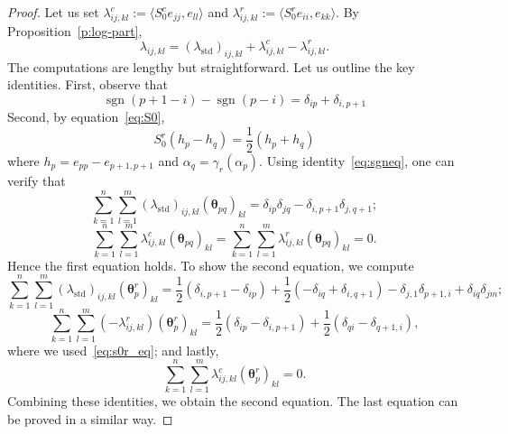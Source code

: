 \documentclass[11pt]{article}
\newcommand{\btheta}{{\boldsymbol{\theta}}}
\newcommand{\std}{\mathrm{std}}
\DeclareMathOperator{\sgn}{sgn}
\theoremstyle{definition}\newtheorem{definition}[theorem]{Definition}
\theoremstyle{definition}\newtheorem{remark}[theorem]{Remark}
\theoremstyle{remark}
\numberwithin{equation}{section}
\begin{document}
\begin{proof}
    Let us set $\lambda_{ij,kl}^c := \langle S_0^c e_{jj}, e_{ll}\rangle$ and $\lambda_{ij,kl}^r := \langle S_0^r e_{ii},e_{kk}\rangle$. By Proposition~\ref{p:log-part},
    \begin{equation*}
        \lambda_{ij,kl} = (\lambda_{\std})_{ij,kl} + \lambda_{ij,kl}^c-\lambda_{ij,kl}^r.
    \end{equation*}
    The computations are lengthy but straightforward. Let us outline the key identities. First, observe that 
    \begin{equation}\label{eq:sgneq}
        \sgn(p+1-i) -\sgn(p-i) = \delta_{ip}+\delta_{i,p+1}
    \end{equation}
    Second, by equation~\eqref{eq:S0},
    \begin{equation}\label{eq:s0r_eq}
        S_0^r(h_p-h_q) = \frac{1}{2}(h_p+h_q)
    \end{equation}
    where $h_p = e_{pp}-e_{p+1,p+1}$ and $\alpha_q = \gamma_r(\alpha_p)$. Using identity~\eqref{eq:sgneq}, one can verify that
    \begin{equation*}
        \sum_{k=1}^n\sum_{l=1}^m (\lambda_{\std})_{ij,kl} (\btheta_{pq})_{kl} = \delta_{ip}\delta_{jq} - \delta_{i,p+1}\delta_{j,q+1};
    \end{equation*}
    \begin{equation*}
        \sum_{k=1}^n\sum_{l=1}^m \lambda_{ij,kl}^c (\btheta_{pq})_{kl} = \sum_{k=1}^n\sum_{l=1}^m \lambda_{ij,kl}^r (\btheta_{pq})_{kl} = 0.
    \end{equation*}
    Hence the first equation holds. To show the second equation, we compute
    \begin{equation*}
        \sum_{k=1}^n \sum_{l=1}^m (\lambda_{\std})_{ij,kl}(\btheta_p^r)_{kl} = \frac{1}{2}( \delta_{i,p+1}-\delta_{ip}) + \frac{1}{2}(-\delta_{iq} + \delta_{i,q+1}) - \delta_{j,1}\delta_{p+1,i} + \delta_{iq}\delta_{jm};
    \end{equation*}
    \begin{equation*}
        \sum_{k=1}^n \sum_{l=1}^m(-\lambda^r_{ij,kl})(\btheta_p^r)_{kl} = \frac{1}{2}(\delta_{ip} - \delta_{i,p+1}) + \frac{1}{2}(\delta_{qi} - \delta_{q+1,i}),
    \end{equation*}
    where we used~\eqref{eq:s0r_eq}; and lastly,
    \begin{equation*}
        \sum_{k=1}^n \sum_{l=1}^m \lambda^c_{ij,kl} (\btheta_p^r)_{kl} = 0.
    \end{equation*}
    Combining these identities, we obtain the second equation. The last equation can be proved in a similar way.


\end{proof}
\end{document}
